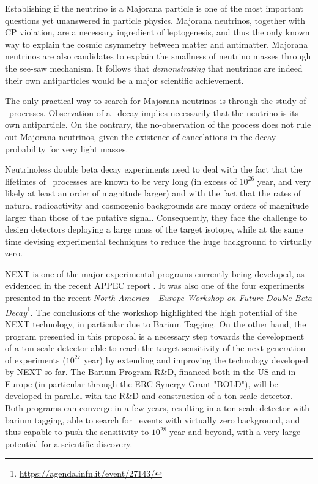 

Establishing if the neutrino is a Majorana particle is one of the most important questions yet unanswered in particle physics. Majorana neutrinos, together with CP violation, are a necessary ingredient of leptogenesis, and thus the only known way to explain the cosmic asymmetry between matter and antimatter. Majorana neutrinos are also candidates to explain the smallness of neutrino masses through the see-saw mechanism. It follows that {\em demonstrating} that neutrinos are indeed their own antiparticles would be a major scientific achievement.

The only practical way to search for Majorana neutrinos is through the study of \bbonu\ processes. Observation of a \bbonu\ decay implies necessarily that the neutrino is its own antiparticle. On the contrary, the no-observation of the process does not rule out Majorana neutrinos, given the existence of cancelations in the decay probability for very light masses. 

Neutrinoless double beta decay experiments need to deal with the fact that the lifetimes of \bbonu\ processes are known to be very long (in excess of $10^{26}$ year, and very likely at least an order of magnitude larger) and with the fact that the rates of natural radioactivity and cosmogenic backgrounds are many orders of magnitude larger than those of the putative signal. Consequently, they face the challenge to design detectors deploying a large mass of the target isotope, while at the same time devising experimental techniques to reduce the huge background to virtually zero. 

NEXT is one of the major experimental programs currently being developed, as evidenced in the recent APPEC report \cite{Giuliani:2019uno}. It was also one of the four experiments presented in the recent {\it North America - Europe Workshop on Future Double Beta Decay}\footnote{\url{https://agenda.infn.it/event/27143/}}. The conclusions of the workshop highlighted the high potential of the NEXT technology, in particular due to Barium Tagging. On the other hand, the program presented in this proposal is a necessary step towards the development of a ton-scale detector able to reach the target sensitivity of the next generation of experiments
($10^{27}$ year) by extending and improving the technology developed by NEXT so far. The Barium Program R\&D, financed both in the US and in Europe (in particular through the ERC Synergy Grant "BOLD"), will be developed in parallel with the R\&D and construction of a ton-scale detector. Both programs can converge in a few years, resulting in a ton-scale detector with barium tagging, able to search for \bbonu\ events with virtually zero background, and thus capable to push the sensitivity to  $10^{28}$ year and beyond, with a very large potential for a scientific discovery.

